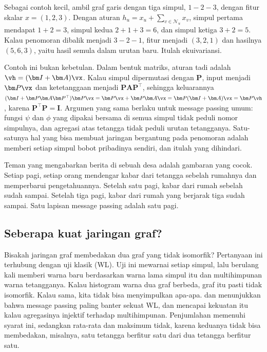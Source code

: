 Sebagai contoh kecil, ambil graf garis dengan tiga simpul, $1-2-3$, dengan fitur skalar
$x=(1,2,3)$. Dengan aturan $h_u=x_u+\sum_{v\in\mathcal N_u}x_v$, simpul pertama mendapat $1+2=3$,
simpul kedua $2+1+3=6$, dan simpul ketiga $3+2=5$. Kalau penomoran dibalik menjadi $3-2-1$, fitur
menjadi $(3,2,1)$ dan hasilnya $(5,6,3)$, yaitu hasil semula dalam urutan baru. Itulah
ekuivariansi.

Contoh ini bukan kebetulan. Dalam bentuk matriks, aturan tadi adalah $\vh=(\bm I+\bm A)\vx$. Kalau simpul
dipermutasi dengan $\bm P$, input menjadi $\bm P\vx$ dan ketetanggaan menjadi $\bm P\bm A\bm P^\top$, sehingga
keluarannya $(\bm I+\bm P\bm A\bm P^\top)\bm P\vx=\bm P\vx+\bm P\bm A\vx=\bm P(\bm I+\bm A)\vx=\bm P\vh$,
karena $\bm P^\top\bm P=\bm I$. Argumen yang sama berlaku untuk message passing umum: fungsi $\psi$ dan
$\phi$ yang dipakai bersama di semua simpul tidak peduli nomor simpulnya, dan agregasi atas tetangga
tidak peduli urutan tetangganya. Satu-satunya hal yang bisa membuat jaringan bergantung pada penomoran
adalah memberi setiap simpul bobot pribadinya sendiri, dan itulah yang dihindari.

Teman yang mengabarkan berita di sebuah desa adalah gambaran yang cocok. Setiap pagi, setiap
orang mendengar kabar dari tetangga sebelah rumahnya dan memperbarui pengetahuannya. Setelah satu
pagi, kabar dari rumah sebelah sudah sampai. Setelah tiga pagi, kabar dari rumah yang berjarak
tiga sudah sampai. Satu lapisan message passing adalah satu pagi.

\subsection{Seberapa kuat jaringan graf?}

Bisakah jaringan graf membedakan dua graf yang tidak isomorfik? Pertanyaan ini terhubung dengan
uji klasik  (WL). Uji ini mewarnai setiap simpul, lalu berulang kali
memberi warna baru berdasarkan warna lama simpul itu dan multihimpunan warna tetangganya. Kalau
histogram warna dua graf berbeda, graf itu pasti tidak isomorfik. Kalau sama, kita tidak bisa
menyimpulkan apa-apa. \citet{xu2019} dan \citet{morris2019} menunjukkan bahwa message passing paling
banter sekuat WL, dan mencapai kekuatan itu kalau agregasinya injektif terhadap multihimpunan.
Penjumlahan memenuhi syarat ini, sedangkan rata-rata dan maksimum tidak, karena keduanya tidak bisa
membedakan, misalnya, satu tetangga berfitur satu dari dua tetangga berfitur satu.


